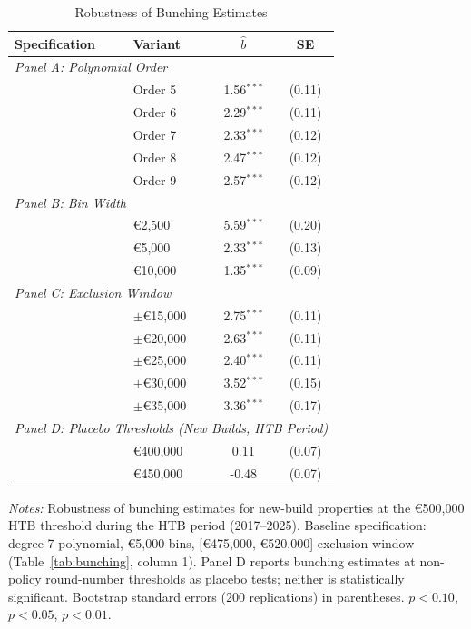 \begin{table}[H]
\centering
\caption{Robustness of Bunching Estimates}
\label{tab:robustness}
\begin{threeparttable}
\begin{tabular}{llcc}
\toprule
Specification & Variant & $\hat{b}$ & SE \\
\midrule
\multicolumn{4}{l}{\textit{Panel A: Polynomial Order}} \\[3pt]
 & Order 5 & 1.56$^{***}$ & (0.11) \\
 & Order 6 & 2.29$^{***}$ & (0.11) \\
 & Order 7 & 2.33$^{***}$ & (0.12) \\
 & Order 8 & 2.47$^{***}$ & (0.12) \\
 & Order 9 & 2.57$^{***}$ & (0.12) \\
\midrule
\multicolumn{4}{l}{\textit{Panel B: Bin Width}} \\[3pt]
 & \euro{}2,500 & 5.59$^{***}$ & (0.20) \\
 & \euro{}5,000 & 2.33$^{***}$ & (0.13) \\
 & \euro{}10,000 & 1.35$^{***}$ & (0.09) \\
\midrule
\multicolumn{4}{l}{\textit{Panel C: Exclusion Window}} \\[3pt]
 & $\pm$\euro{}15,000 & 2.75$^{***}$ & (0.11) \\
 & $\pm$\euro{}20,000 & 2.63$^{***}$ & (0.11) \\
 & $\pm$\euro{}25,000 & 2.40$^{***}$ & (0.11) \\
 & $\pm$\euro{}30,000 & 3.52$^{***}$ & (0.15) \\
 & $\pm$\euro{}35,000 & 3.36$^{***}$ & (0.17) \\
\midrule
\multicolumn{4}{l}{\textit{Panel D: Placebo Thresholds (New Builds, HTB Period)}} \\[3pt]
 & \euro{}400,000 & 0.11 & (0.07) \\
 & \euro{}450,000 & -0.48 & (0.07) \\
\bottomrule
\end{tabular}
\begin{tablenotes}[flushleft]
\small
\item \textit{Notes:} Robustness of bunching estimates for new-build properties at the \euro{}500,000 HTB threshold during the HTB period (2017--2025). Baseline specification: degree-7 polynomial, \euro{}5,000 bins, [\euro{}475,000, \euro{}520,000] exclusion window (Table~\ref{tab:bunching}, column 1). Panel D reports bunching estimates at non-policy round-number thresholds as placebo tests; neither is statistically significant. Bootstrap standard errors (200 replications) in parentheses. \sym{*} $p<0.10$, \sym{**} $p<0.05$, \sym{***} $p<0.01$.
\end{tablenotes}
\end{threeparttable}
\end{table}
